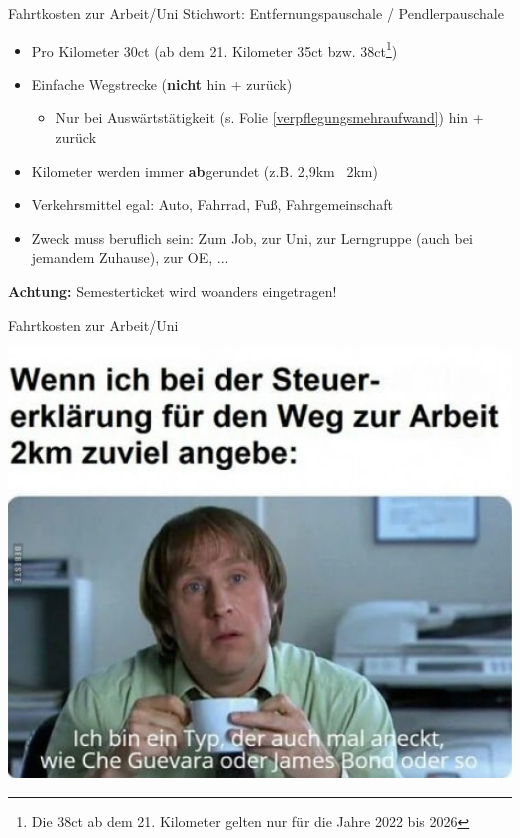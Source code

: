\documentclass{beamer}
\begin{document}
			\begin{frame}{Fahrtkosten zur Arbeit/Uni}
				Stichwort: Entfernungspauschale / Pendlerpauschale\n
				
				\begin{itemize}
					\item Pro Kilometer 30ct (ab dem 21. Kilometer 35ct bzw. 38ct\footnote{Die 38ct ab dem 21. Kilometer gelten nur für die Jahre 2022 bis 2026})
					\item Einfache Wegstrecke (\textbf{nicht} hin + zurück)
					\begin{itemize}
						\item Nur bei Auswärtstätigkeit (s. Folie \ref{verpflegungsmehraufwand}) hin + zurück
					\end{itemize}
					\item Kilometer werden immer \textbf{ab}gerundet (z.B. 2,9km \textrightarrow\ 2km)
					\item Verkehrsmittel egal: Auto, Fahrrad, Fuß, Fahrgemeinschaft
					\item Zweck muss beruflich sein: Zum Job, zur Uni, zur Lerngruppe (auch bei jemandem Zuhause), zur OE, ...
				\end{itemize}\n\pause
				
				\textbf{Achtung:} Semesterticket wird woanders eingetragen!
			\end{frame}
			
			\begin{frame}{Fahrtkosten zur Arbeit/Uni}
				\begin{center}
					\includegraphics[height=0.85\textheight]{images/meme-fahrtkosten.jpg}
				\end{center}
			\end{frame}
		
\end{document}
